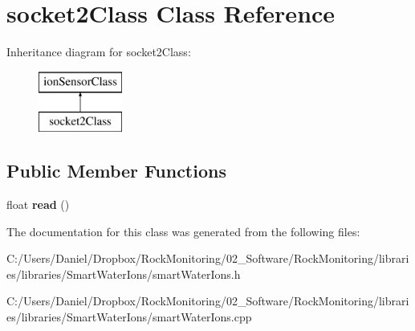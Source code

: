 \hypertarget{classsocket2_class}{}\section{socket2\+Class Class Reference}
\label{classsocket2_class}
Inheritance diagram for socket2\+Class\+:\begin{figure}[H]
\begin{center}
\leavevmode
\includegraphics[height=2.000000cm]{classsocket2_class}
\end{center}
\end{figure}
\subsection*{Public Member Functions}
\begin{DoxyCompactItemize}
\item 
float {\bfseries read} ()\hypertarget{classsocket2_class_a719c05f1e5a2170c1b8c69d01bb3bfbe}{}\label{classsocket2_class_a719c05f1e5a2170c1b8c69d01bb3bfbe}

\end{DoxyCompactItemize}


The documentation for this class was generated from the following files\+:\begin{DoxyCompactItemize}
\item 
C\+:/\+Users/\+Daniel/\+Dropbox/\+Rock\+Monitoring/02\+\_\+\+Software/\+Rock\+Monitoring/libraries/libraries/\+Smart\+Water\+Ions/smart\+Water\+Ions.\+h\item 
C\+:/\+Users/\+Daniel/\+Dropbox/\+Rock\+Monitoring/02\+\_\+\+Software/\+Rock\+Monitoring/libraries/libraries/\+Smart\+Water\+Ions/smart\+Water\+Ions.\+cpp\end{DoxyCompactItemize}

